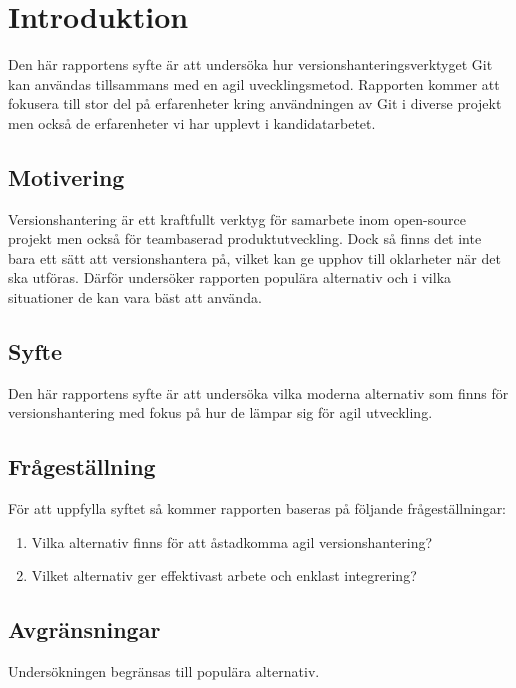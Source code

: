 \section{Introduktion}
\label{sec:bjorn-introduction}

Den här rapportens syfte är att undersöka hur versionshanteringsverktyget Git kan användas tillsammans med en agil uvecklingsmetod. Rapporten kommer att fokusera till stor del på erfarenheter kring användningen av Git i diverse projekt men också de erfarenheter vi har upplevt i kandidatarbetet.

\subsection{Motivering}
\label{subsec:motivation}

Versionshantering är ett kraftfullt verktyg för samarbete inom open-source projekt men också för teambaserad produktutveckling. Dock så finns det inte bara ett sätt att versionshantera på, vilket kan ge upphov till oklarheter när det ska utföras. Därför undersöker rapporten populära alternativ och i vilka situationer de kan vara bäst att använda.

\subsection{Syfte}
\label{subsec:reason}
Den här rapportens syfte är att undersöka vilka moderna alternativ som finns för versionshantering med fokus på hur de lämpar sig för agil utveckling.

\subsection{Frågeställning}
\label{subsec:research-questions}

För att uppfylla syftet så kommer rapporten baseras på följande frågeställningar:

\begin{enumerate}
\item Vilka alternativ finns för att åstadkomma agil versionshantering?

\item Vilket alternativ ger effektivast arbete och enklast integrering?
\end{enumerate}

\subsection{Avgränsningar}
\label{subsec:delimitations}

Undersökningen begränsas till populära alternativ.